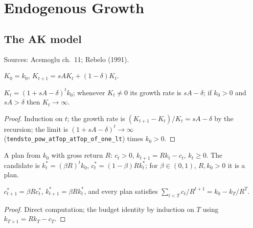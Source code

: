 \chapter{Endogenous Growth}
\label{chap:growth_endogenous}

\section{The AK model}
\label{sec:ak}

Sources: Acemoglu ch.~11; Rebelo (1991).

\begin{definition}
\label{def:ak_kpath}
\leanok
$K_0 = k_0$, $K_{t+1} = sAK_t + (1-\delta)K_t$.
\end{definition}

\begin{theorem}
\label{thm:ak_solow}
\leanok
{}
$K_t = (1 + sA - \delta)^t k_0$; whenever $K_t \ne 0$ its growth rate is $sA - \delta$; if $k_0 > 0$ and $sA > \delta$
then $K_t \to \infty$.
\end{theorem}
\begin{proof}
\leanok
Induction on $t$; the growth rate is $(K_{t+1} - K_t)/K_t = sA - \delta$ by the recursion; the limit is
$(1 + sA - \delta)^t \to \infty$ (\texttt{tendsto\_pow\_atTop\_atTop\_of\_one\_lt}) times $k_0 > 0$.
\end{proof}

\begin{definition}
\label{def:ak_plan}
\leanok
A plan from $k_0$ with gross return $R$: $c_t > 0$, $k_{t+1} = Rk_t - c_t$, $k_t \ge 0$. The candidate is
$k^*_t = (\beta R)^t k_0$, $c^*_t = (1-\beta)Rk^*_t$; for $\beta \in (0,1)$, $R, k_0 > 0$ it is a plan.
\end{definition}

\begin{lemma}
\label{lem:ak_budget}
\leanok
{}
$c^*_{t+1} = \beta R c^*_t$, $k^*_{t+1} = \beta R k^*_t$, and every plan satisfies
$\sum_{t<T} c_t/R^{t+1} = k_0 - k_T/R^T$.
\end{lemma}
\begin{proof}
\leanok
Direct computation; the budget identity by induction on $T$ using $k_{T+1} = Rk_T - c_T$.
\end{proof}

